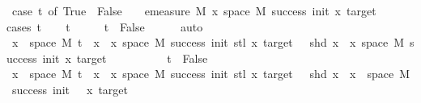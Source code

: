 \begin{isabellebody}
{\isacharequal}{\kern0pt}\ {\isacharparenleft}{\kern0pt}case\ t\ of\ True\ {\isasymRightarrow}\ {}{\isacharbar}{\kern0pt}False\ {\isasymRightarrow}\ {}{\isacharparenright}{\kern0pt}\ {\isacharasterisk}{\kern0pt}\ {\isacharparenleft}{\kern0pt}emeasure\ M\ {\isacharbraceleft}{\kern0pt}x{\isasymin}\ space\ M{\isachardot}{\kern0pt}\ success\ {\isacharparenleft}{\kern0pt}init{\isacharminus}{\kern0pt}{}{\isacharparenright}{\kern0pt}\ {\isacharparenleft}{\kern0pt}x{\isacharparenright}{\kern0pt}\ target{\isacharbraceright}{\kern0pt}{\isacharparenright}{\kern0pt}{\isachardoublequoteclose}\isanewline
%
\isadelimproof
%
\endisadelimproof
%
\isatagproof
{}\isamarkupfalse%
{\isacharparenleft}{\kern0pt}cases\ t{\isacharparenright}{\kern0pt}\isanewline
\ \ \isamarkupfalse%
\ {\isachardoublequoteopen}{\isasymnot}t{\isachardoublequoteclose}\isanewline
\ \ \isamarkupfalse%
\ \isamarkupfalse%
\ {\isachardoublequoteopen}t\ {\isacharequal}{\kern0pt}\ False{\isachardoublequoteclose}\isanewline
\ \ \ \ \isamarkupfalse%
\ auto\isanewline
\ \ \ \isamarkupfalse%
\ {\isachardoublequoteopen}{\isacharbraceleft}{\kern0pt}x\ {\isasymin}\ space\ M{\isachardot}{\kern0pt}\ t\ {\isacharhash}{\kern0pt}{\isacharhash}{\kern0pt}\ x\ {\isasymin}\ {\isacharbraceleft}{\kern0pt}x{\isasymin}\ space\ M{\isachardot}{\kern0pt}\ success\ {\isacharparenleft}{\kern0pt}init{\isacharminus}{\kern0pt}{}{\isacharparenright}{\kern0pt}\ {\isacharparenleft}{\kern0pt}stl\ x{\isacharparenright}{\kern0pt}\ target\ {\isasymand}\ {\isasymnot}\ shd\ x{\isacharbraceright}{\kern0pt}{\isacharbraceright}{\kern0pt}\ {\isacharequal}{\kern0pt}\ {\isacharbraceleft}{\kern0pt}x{\isasymin}\ space\ M{\isachardot}{\kern0pt}\ success\ {\isacharparenleft}{\kern0pt}init{\isacharminus}{\kern0pt}{}{\isacharparenright}{\kern0pt}\ {\isacharparenleft}{\kern0pt}x{\isacharparenright}{\kern0pt}\ target{\isacharbraceright}{\kern0pt}{\isachardoublequoteclose}\isanewline
\ \ \ \ \ \ \ \ \ \ {\isachardoublequoteopen}t\ {\isacharequal}{\kern0pt}\ False{\isachardoublequoteclose}\isanewline
\ \ \ \ \ \ \isamarkupfalse%
\isanewline
\ \ \ \ \ \ \ \ \isamarkupfalse%
\ {\isachardoublequoteopen}{\isacharbraceleft}{\kern0pt}x\ {\isasymin}\ space\ M{\isachardot}{\kern0pt}\ t\ {\isacharhash}{\kern0pt}{\isacharhash}{\kern0pt}\ x\ {\isasymin}\ {\isacharbraceleft}{\kern0pt}x{\isasymin}\ space\ M{\isachardot}{\kern0pt}\ success\ {\isacharparenleft}{\kern0pt}init{\isacharminus}{\kern0pt}{}{\isacharparenright}{\kern0pt}\ {\isacharparenleft}{\kern0pt}stl\ x{\isacharparenright}{\kern0pt}\ target\ {\isasymand}\ {\isasymnot}\ shd\ x{\isacharbraceright}{\kern0pt}{\isacharbraceright}{\kern0pt}\ {\isasymsubseteq}\ {\isacharbraceleft}{\kern0pt}x\ {\isasymin}\ space\ M{\isachardot}{\kern0pt}\ success\ {\isacharparenleft}{\kern0pt}init\ {\isacharminus}{\kern0pt}\ {}{\isacharparenright}{\kern0pt}\ x\ target{\isacharbraceright}{\kern0pt}{\isachardoublequoteclose}\isanewline

\end{isabellebody}
